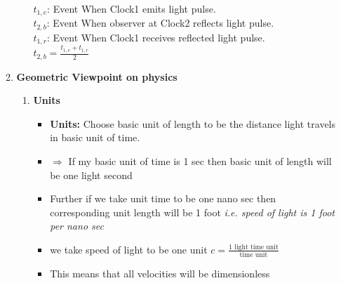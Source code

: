 \documentclass[11pt,a4paper]{article}
\begin{document}
\begin{enumerate}
\begin{enumerate}
\begin{enumerate}
\begin{figure}[H]
                                  \caption{} \label{Fig.1}
                              \end{figure}
                              $t_{1,e}$: Event When Clock1 emits light pulse.\\
                              $t_{2,b}$: Event When observer at Clock2 reflects light pulse.\\
                              $t_{1,r}$: Event When Clock1 receives reflected light pulse.\\
                              $t_{2,b}=\displaystyle{\frac{t_{1,e}+t_{1,r}}{2}}$\\
                    \end{enumerate}
              \item \textbf{\Large Geometric Viewpoint on physics}
                    \begin{enumerate}
                        \item \textbf{Units}
                              \begin{itemize}
                                  \item \textbf{Units:} Choose basic unit of length to be the distance light travels in basic unit of time.
                                  \item $\Rightarrow$ If my basic unit of time is 1 sec then basic unit of length will be one light second
                                  \item Further if we take unit time to be one nano sec then corresponding unit length will be 1 foot \textit{i.e. speed of light is 1 foot per nano sec}
                                  \item we take speed of light to be one unit $c=\displaystyle{\frac{\text{1 light time unit}}{\text{time unit}}}$
                                  \item This means that all velocities will be dimensionless
                              \end{itemize}

\end{enumerate}
\end{enumerate}
\end{enumerate}
\end{document}
